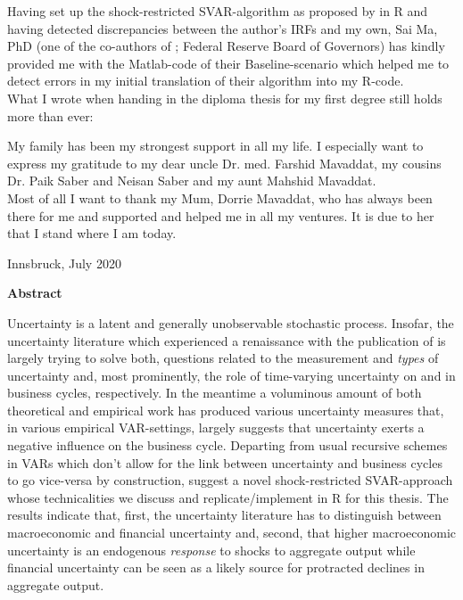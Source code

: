 \documentclass[a4paper,11pt,listof=nochaptergap,oneside,pointednumbers,bibtotoc,bigheadings,liststotoc]{scrbook}
\makeatletter
\theoremstyle{mysatz}
\theoremstyle{mydefinition}
\theoremstyle{mytheorem}
\theoremstyle{mybemerkung}
\newcommand\abstractname{Abstract}  %
\newenvironment{abstract}{%
      \titlepage
      \null\vfil
      \@beginparpenalty\@lowpenalty
      \begin{center}%
        \bfseries \abstractname
        \@endparpenalty\@M
      \end{center}}%
     {\par\vfil\null\endtitlepage}
\newenvironment{abstract}{%
      \if@twocolumn
        \section*{\abstractname}%
      \else
        \small
        \begin{center}%
          {\bfseries \abstractname\vspace{-.5em}\vspace{\z@}}%
        \end{center}%
        \quotation
      \fi}
      {\if@twocolumn\else\endquotation\fi}
\makeatother
\begin{document}
Having set up the shock-restricted SVAR-algorithm as proposed by \citet{ludvigsonetal:18} in R and having detected discrepancies between the author's IRFs and my own, Sai Ma, PhD (one of the co-authors of \citet{ludvigsonetal:17}; Federal Reserve Board of Governors) has kindly provided me with the Matlab-code of their Baseline-scenario which helped me to detect errors in my initial translation of their algorithm into my R-code.\\

What I wrote when handing in the diploma thesis for my first degree still holds more than ever:

My family has been my strongest support in all my life. I especially want to express my gratitude to my dear uncle Dr. med. Farshid Mavaddat, my cousins Dr. Paik Saber and Neisan Saber and my aunt Mahshid Mavaddat.\\
Most of all I want to thank my Mum, Dorrie Mavaddat, who has always been there for me and supported and helped me in all my ventures. It is due to her that I stand where I am today.
    \begin{flushright}
         Innsbruck, July 2020\\
    \end{flushright}
\vspace*{\fill}
%
\pagestyle{headings}


\thispagestyle{empty} 
\begin{abstract}
Uncertainty is a latent and generally unobservable stochastic process. Insofar, the uncertainty literature which experienced a renaissance with the publication of \citet{bloom:09} is largely trying to solve both, questions related to the measurement and \textit{types} of uncertainty and, most prominently, the role of time-varying uncertainty on and in business cycles, respectively. In the meantime a voluminous amount of both theoretical and empirical work has produced various uncertainty measures that, in various empirical VAR-settings, largely suggests that uncertainty exerts a negative influence on the business cycle. Departing from usual recursive schemes in VARs which don't allow for the link between uncertainty and business cycles to go vice-versa by construction, \citet{ludvigsonetal:18} suggest a novel shock-restricted SVAR-approach whose technicalities we discuss and replicate/implement in R for this thesis. The results indicate that, first, the uncertainty literature has to distinguish between macroeconomic and financial uncertainty and, second, that higher macroeconomic uncertainty is an endogenous \textit{response} to shocks to aggregate output while financial uncertainty can be seen as a likely source for protracted declines in aggregate output.
\end{abstract}
\end{document}

